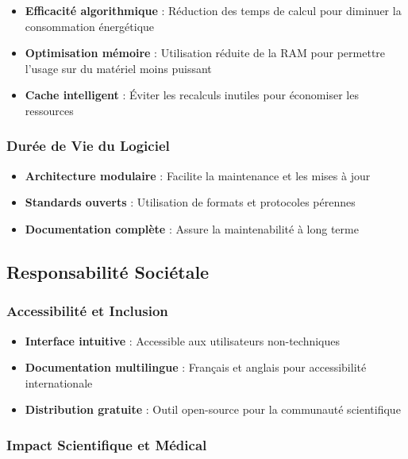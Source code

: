 \documentclass[12pt,a4paper]{article}
\begin{document}
\begin{itemize}
\item \textbf{Efficacité algorithmique} : Réduction des temps de calcul pour diminuer la consommation énergétique
\item \textbf{Optimisation mémoire} : Utilisation réduite de la RAM pour permettre l'usage sur du matériel moins puissant
\item \textbf{Cache intelligent} : Éviter les recalculs inutiles pour économiser les ressources
\end{itemize}

\subsubsection{Durée de Vie du Logiciel}

\begin{itemize}
\item \textbf{Architecture modulaire} : Facilite la maintenance et les mises à jour
\item \textbf{Standards ouverts} : Utilisation de formats et protocoles pérennes
\item \textbf{Documentation complète} : Assure la maintenabilité à long terme
\end{itemize}

\subsection{Responsabilité Sociétale}

\subsubsection{Accessibilité et Inclusion}

\begin{itemize}
\item \textbf{Interface intuitive} : Accessible aux utilisateurs non-techniques
\item \textbf{Documentation multilingue} : Français et anglais pour accessibilité internationale
\item \textbf{Distribution gratuite} : Outil open-source pour la communauté scientifique
\end{itemize}

\subsubsection{Impact Scientifique et Médical}
\end{document}
